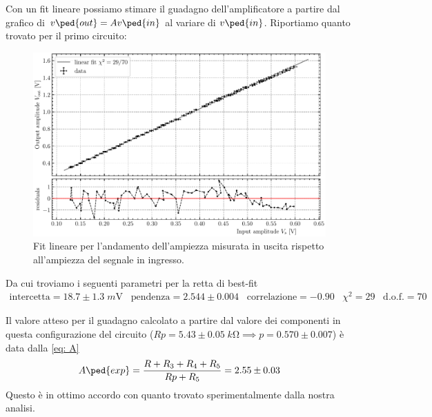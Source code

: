 \documentclass[10pt, a4paper, italian]{article}
\begin{document}
Con un fit lineare possiamo stimare il guadagno dell'amplificatore a partire
dal grafico di $v\ped{out} = A v\ped{in}$ al variare di $v\ped{in}$.
Riportiamo quanto trovato per il primo circuito:
\begin{figure}[htbp]
\centering
\includegraphics[scale=0.7]{gainfit}
\caption{Fit lineare per l'andamento dell'ampiezza misurata in uscita rispetto
all'ampiezza del segnale in ingresso. \label{fig: gainfit}}
\end{figure}
Da cui troviamo i seguenti parametri per la retta di best-fit
\begin{align*}
\text{intercetta} = 18.7 \pm 1.3 \; \si{m\V} \;\;\;
\text{pendenza} = 2.544 \pm 0.004 \;\;\; \text{correlazione} = -0.90
\;\;\; \chi^2 = 29 \;\;\; \text{d.o.f.} = 70
\end{align*}

Il valore atteso per il guadagno calcolato a partire dal valore dei componenti
in questa configurazione del circuito
($Rp = 5.43 \pm 0.05 \; \si{k\ohm} \implies p = 0.570 \pm 0.007$)
è data dalla \cref{eq: A}
\[
A\ped{exp} = \frac{R + R_3 + R_4 + R_5}{Rp + R_5} = 2.55 \pm 0.03
\]
Questo è in ottimo accordo con quanto trovato sperimentalmente dalla nostra
analisi.
\end{document}
